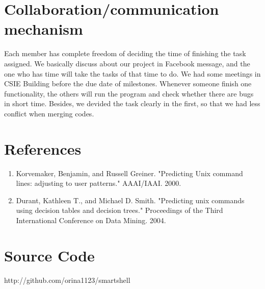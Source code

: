 \documentclass[11pt,a4paper]{article}
\begin{document}
\section*{Collaboration/communication mechanism}
Each member has complete freedom of deciding the time of finishing the task assigned.
We basically discuss about our project in Facebook message, 
and the one who has time will take the tasks of that time to do.
We had some meetings in CSIE Building before the due date of milestones. 
Whenever someone finish one functionality, 
the others will run the program and check whether there are bugs in short time.
Besides, we devided the task clearly in the first, 
so that we had less conflict when merging codes.

\section*{References}
\begin{enumerate}
\item Korvemaker, Benjamin, and Russell Greiner. "Predicting Unix command lines: adjusting to user patterns." AAAI/IAAI. 2000.
\item Durant, Kathleen T., and Michael D. Smith. "Predicting unix commands using decision tables and decision trees." Proceedings of the Third International Conference on Data Mining. 2004.
\end{enumerate}

\section*{Source Code}
http://github.com/orina1123/smartshell




\end{document}
